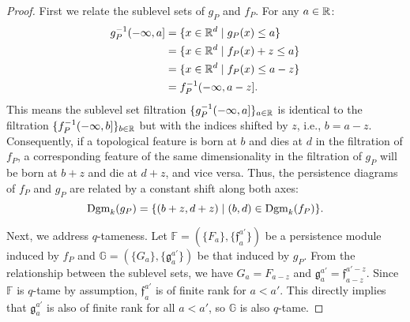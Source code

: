 \begin{proof}
    First we relate the sublevel sets of $g_P$ and $f_P$.
    For any $a \in \mathbb{R}$:
    \begin{align}
        g^{-1}_P(-\infty, a] &= \{x \in \mathbb{R}^d \mid g_P(x) \leq a\} \\
        &= \{x \in \mathbb{R}^d \mid f_P(x) + z \leq a\} \\
        &= \{x \in \mathbb{R}^d \mid f_P(x) \leq a - z\} \\
        &= f^{-1}_P(-\infty, a - z].
    \end{align}
    This means the sublevel set filtration $\{g_P^{-1}(-\infty, a]\}_{a\in \mathbb{R}}$
    is identical to the filtration $\{f_P^{-1}(-\infty, b]\}_{b\in \mathbb{R}}$ but
    with the indices shifted by $z$, i.e., $b = a - z$.
    Consequently, if a topological feature is born at $b$ and dies at $d$ in
    the filtration of $f_P$, a corresponding feature of the same dimensionality
    in the filtration of $g_P$ will be born at $b + z$ and die at $d + z$, and
    vice versa.
    Thus, the persistence diagrams of $f_P$ and $g_P$ are related by a constant
    shift along both axes:
    \begin{equation}
        \operatorname{Dgm}_k(g_P) = \{(b + z, d + z) \mid (b, d) \in \operatorname{Dgm}_k(f_P)\}.
    \end{equation}
    
    Next, we address $q$-tameness.
    Let $\mathbb{F} = (\{F_a\}, \{\mathfrak{f}_a^{a'}\})$ be a persistence
    module induced by $f_P$ and
    $\mathbb{G} = (\{G_a\}, \{\mathfrak{g}_a^{a'}\})$ be that induced by $g_P$.
    From the relationship between the sublevel sets, we have
    $G_a = F_{a - z}$ and $\mathfrak{g}_a^{a'} = \mathfrak{f}_{a - z}^{a' - z}$.
    Since $\mathbb{F}$ is $q$-tame by assumption, $\mathfrak{f}_a^{a'}$ is of
    finite rank for $a < a'$.
    This directly implies that $\mathfrak{g}_a^{a'}$ is also of finite rank for
    all $a < a'$, so $\mathbb{G}$ is also $q$-tame.
    

\end{proof}
